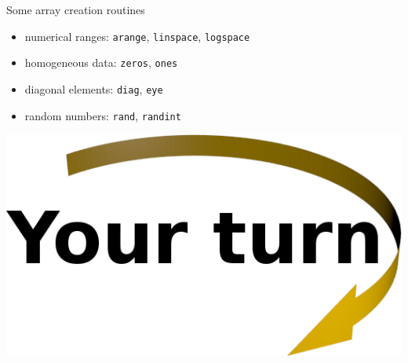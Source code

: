 \documentclass[svgnames]{beamer}
\begin{document}
\begin{frame}{Some array creation routines}

 \begin{itemize}
  \item numerical ranges:
        \texttt{arange}, \texttt{linspace}, \texttt{logspace}
  \item homogeneous data:
        \texttt{zeros}, \texttt{ones}
  \item diagonal elements:
        \texttt{diag}, \texttt{eye}
  \item random numbers:
        \texttt{rand}, \texttt{randint}
 \end{itemize}

 \begin{center}
  \includegraphics[width=3truecm]{yourturn}
 \end{center}
\end{frame}
\end{document}
